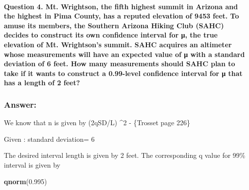 \documentclass[
]{article}
\newenvironment{Shaded}{\begin{snugshade}}{\end{snugshade}}
\newcommand{\FloatTok}[1]{\textcolor[rgb]{0.00,0.00,0.81}{#1}}
\newcommand{\FunctionTok}[1]{\textcolor[rgb]{0.13,0.29,0.53}{\textbf{#1}}}
\newcommand{\NormalTok}[1]{#1}
\begin{document}
\hypertarget{question-4.-mt.-wrightson-the-fifth-highest-summit-in-arizona-and-the-highest-in-pima-county-has-a-reputed-elevation-of-9453-feet.-to-amuse-its-members-the-southern-arizona-hiking-club-sahc-decides-to-construct-its-own-confidence-interval-for-ux3bc-the-true-elevation-of-mt.-wrightsons-summit.-sahc-acquires-an-altimeter-whose-measurements-will-have-an-expected-value-of-ux3bc-with-a-standard-deviation-of-6-feet.-how-many-measurements-should-sahc-plan-to-take-if-it-wants-to-construct-a-0.99-level-confidence-interval-for-ux3bc-that-has-a-length-of-2-feet}{%
\paragraph{Question 4. Mt. Wrightson, the fifth highest summit in
Arizona and the highest in Pima County, has a reputed elevation of 9453
feet. To amuse its members, the Southern Arizona Hiking Club (SAHC)
decides to construct its own confidence interval for μ, the true
elevation of Mt. Wrightson's summit. SAHC acquires an altimeter whose
measurements will have an expected value of μ with a standard deviation
of 6 feet. How many measurements should SAHC plan to take if it wants to
construct a 0.99-level confidence interval for μ that has a length of 2
feet?}\label{question-4.-mt.-wrightson-the-fifth-highest-summit-in-arizona-and-the-highest-in-pima-county-has-a-reputed-elevation-of-9453-feet.-to-amuse-its-members-the-southern-arizona-hiking-club-sahc-decides-to-construct-its-own-confidence-interval-for-ux3bc-the-true-elevation-of-mt.-wrightsons-summit.-sahc-acquires-an-altimeter-whose-measurements-will-have-an-expected-value-of-ux3bc-with-a-standard-deviation-of-6-feet.-how-many-measurements-should-sahc-plan-to-take-if-it-wants-to-construct-a-0.99-level-confidence-interval-for-ux3bc-that-has-a-length-of-2-feet}}

\hypertarget{answer-1}{%
\subsubsection{Answer:}\label{answer-1}}

We know that n is given by (2qSD/L) \^{}2 - \{Trosset page 226\}

Given : standard deviation= 6

The desired interval length is given by 2 feet. The corresponding q
value for 99\% interval is given by

\begin{Shaded}
\begin{Highlighting}[]
\FunctionTok{qnorm}\NormalTok{(}\FloatTok{0.995}\NormalTok{)}
\end{Highlighting}
\end{Shaded}
\end{document}
